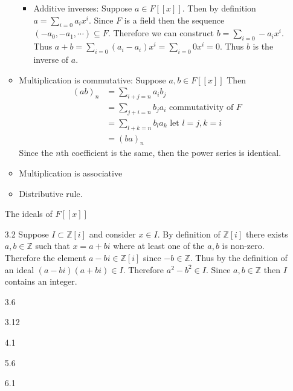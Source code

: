 \documentclass[12pt, letterpaper]{article}
\newcommand{\Z}{\mathbb{Z}}
\begin{document}
\begin{enumerate}
\begin{itemize}
\begin{itemize}
			
			\item Additive inverses: Suppose $a \in F[[x]]$.  
			Then by definition $a = \sum_{i=0}a_ix^i$.  Since $F$ is a field
			then the sequence $(-a_0,-a_1,\cdots) \subseteq F$.  Therefore 
			we can construct $b = \sum_{i=0}-a_ix^i$.  
			Thus $a+b = \sum_{i=0} (a_i - a_i)x^i = \sum_{i=0} 0x^i = 0$.
			Thus $b$ is the inverse of $a$.  
		\end{itemize}
		\item Multiplication is commutative: Suppose $a,b \in F[[x]]$ Then 
		\begin{align*}
		(ab)_n  &= \sum_{i+j = n}a_ib_j\\
		&= \sum_{j+i = n}b_ja_i  \text{ commutativity of } F\\
		&= \sum_{l+k = n}b_la_k  \text{ let } l = j, k = i\\
		&= (ba)_n
		\end{align*}
		Since the $n$th coefficient is the same, then the power series is identical.  
		\item Multiplication is associative
		\item Distributive rule.  
	\end{itemize}
	The ideals of $F[[x]]$
	\item[3.2] Suppose $I \subset \Z[i]$ and consider $x \in I$.  
	By definition of $\Z[i]$ there exists $a,b \in \Z$ such that $x = a+ bi$ where at least one of the $a,b$ is non-zero.  Therefore the element $a-bi \in \Z[i]$ since $-b \in \Z$.  Thus
	by the definition of an ideal $(a-bi)(a+bi) \in I$.  Therefore
	$a^2 - b^2 \in I$.  Since $a,b \in \Z$ then $I$ contains an integer.	
	\item[3.6]
	\item[3.12]
	\item[4.1]
	\item[5.6]
	\item[6.1]
\end{enumerate}
\end{document}
